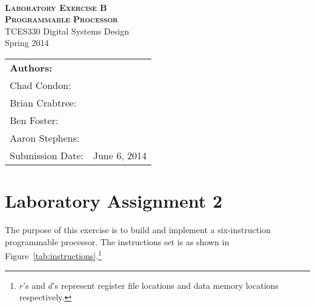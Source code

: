 \documentclass[12pt]{article}
\begin{document}
\begin{titlepage}
    \center
    \qquad\\[7cm]
    \textsc{\huge \bfseries Laboratory Exercise B} \\[.5cm]
    \textsc{\huge \bfseries Programmable Processor} \\[1.0cm]
    {\large TCES330 Digital Systems Design} \\[.5cm]
    {\large Spring 2014} \\[1.5cm]
    
    \begin{tabular}{ll}
        \multicolumn{2}{l}{\textbf{Authors:}}   \\
        Chad Condon:        & \underline{\hspace{5cm}} \\
        Brian Crabtree:     & \underline{\hspace{5cm}} \\
        Ben Foster:         & \underline{\hspace{5cm}} \\
        Aaron Stephens:     & \underline{\hspace{5cm}} \\
        Submission Date:    & June 6, 2014
    \end{tabular}
    
\end{titlepage}

\tableofcontents
\pagebreak

\section*{Laboratory Assignment 2}  \FloatBarrier

The purpose of this exercise is to build and implement a six-instruction programmable processor.
The instructions set is as shown in Figure~\ref{tab:instructions}.\footnote{$r$'s and $d$'s represent register file locations and data memory locations respectively.}
\end{document}
